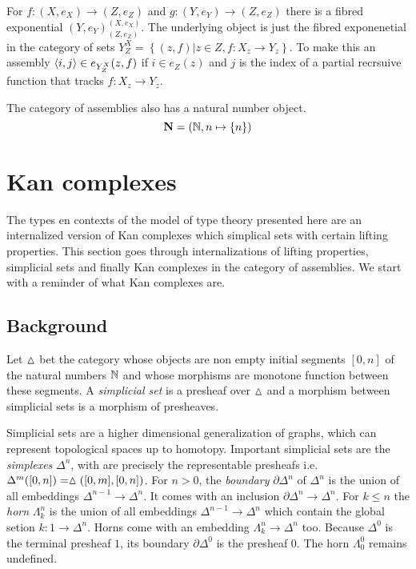 \documentclass{amsart}
\theoremstyle{plain}
\theoremstyle{definition}
\newcommand\hide[1]{}
\newcommand\set[1]{\left\{#1\right\}}
\begin{document}
For $f:(X,e_X) \to (Z,e_Z)$ and $g:(Y,e_Y) \to (Z,e_Z)$ there is a fibred exponential $(Y,e_Y)^{(X,e_X)}_{(Z,e_Z)}$. The underlying object is just the fibred exponenetial in the category of sets $Y^X_Z = \set{(z,f)|z\in Z, f:X_z\to Y_z }$. To make this an assembly $\left\langle i,j\right\rangle\in e_{Y^X_Z}(z,f)$ if $i\in e_Z(z)$ and $j$ is the index of a partial recrsuive function that tracks $f:X_z\to Y_z$.

The category of assemblies also has a natural number object.
\[ \nno = (\N, n\mapsto \set n)  \]

\hide{overzicht assemblies

Wat moet hierin?

-definitie van assemblies en morfismes.

-misschien definities van producten, beelden, exponentials, coproducten etc.

-natuurlijk getals object en misschien coinductive objecten.

-generiek monomorfisme?
}



\section{Kan complexes}
The types en contexts of the model of type theory presented here are an internalized version of Kan complexes which simplical sets with certain lifting properties. This section goes through internalizations of lifting properties, simplicial sets and finally Kan complexes in the category of assemblies. We start with a reminder of what Kan complexes are.


\subsection{Background}
Let $\vartriangle$ bet the category whose objects are non empty initial segments $[0,n]$ of the natural numbers $\mathbb N$ and whose morphisms are monotone function between these segments. A \emph{simplicial set} is a presheaf over $\vartriangle$ and a morphism between simplicial sets is a morphism of presheaves.

Simplicial sets are a higher dimensional generalization of graphs, which can represent topological spaces up to homotopy. Important simplicial sets are the \emph{simplexes} $\Delta^n$, with are precisely the representable presheafs i.e. $\Delta^m([0,n]) = \vartriangle([0,m],[0,n])$. For $n>0$, the \emph{boundary} $\partial\Delta^n$ of $\Delta^n$ is the union of all embeddings $\Delta^{n-1}\to \Delta^n$. It comes with an inclusion $\partial\Delta^n \to \Delta^n$. For $k\leq n$ the \emph{horn} $\Lambda^n_k$ is the union of all embeddings $\Delta^{n-1}\to \Delta^n$ which contain the global setion $k:1 \to \Delta^n$. Horns come with an embedding $\Lambda^n_k \to \Delta^n$ too. Because $\Delta^0$ is the terminal presheaf $1$, its boundary $\partial\Delta^0$ is the presheaf $0$. The horn $\Lambda^0_0$ remains undefined.
\end{document}
